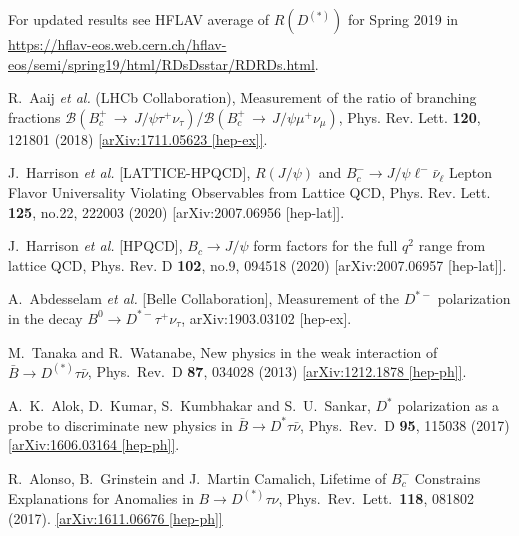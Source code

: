 \documentclass[reprint,showpacs,aps,prd,nofootinbib,superscriptaddress,longbibliography]{revtex4-1}
\begin{document}
\begin{thebibliography}{99}
For updated results see HFLAV average of $R(D^{(\ast)})$ for Spring 2019 in \url{https://hflav-eos.web.cern.ch/hflav-eos/semi/spring19/html/RDsDsstar/RDRDs.html}.


R.~Aaij {\it et al.} (LHCb Collaboration), Measurement of the ratio of branching fractions $\mathcal{B}(B_c^+\,\to\,J/\psi\tau^+\nu_\tau)$/$\mathcal{B}(B_c^+\,\to\,J/\psi\mu^+\nu_\mu)$,  Phys. Rev. Lett. \textbf{120}, 121801 (2018) \href{http://arxiv.org/abs/1711.05623}{[arXiv:1711.05623 [hep-ex]]}.

J.~Harrison \textit{et al.} [LATTICE-HPQCD], $R(J/\psi)$ and $B_c^- \rightarrow J/\psi \ell^-\bar{\nu}_\ell$ Lepton Flavor Universality Violating Observables from Lattice QCD,
Phys. Rev. Lett. \textbf{125}, no.22, 222003 (2020)
[arXiv:2007.06956 [hep-lat]].

J.~Harrison \textit{et al.} [HPQCD], $B_c \rightarrow J/\psi$ form factors for the full $q^2$ range from lattice QCD,
Phys. Rev. D \textbf{102}, no.9, 094518 (2020)
[arXiv:2007.06957 [hep-lat]].

  A.~Abdesselam {\it et al.} [Belle Collaboration],
  Measurement of the $D^{\ast-}$ polarization in the decay $B^0 \to D^{\ast -}\tau^+\nu_{\tau}$,
  arXiv:1903.03102 [hep-ex].

M.~Tanaka and R.~Watanabe, New physics in the weak interaction of $\bar B\to D^{(*)}\tau\bar\nu$, Phys.\ Rev.\ D {\bf 87}, 034028 (2013)
\href{http://arxiv.org/abs/1212.1878}{[arXiv:1212.1878 [hep-ph]]}.

A.~K.~Alok, D.~Kumar, S.~Kumbhakar and S.~U.~Sankar, $D^{*}$ polarization as a probe to discriminate new physics in $\bar{B}\to D^{*} \tau \bar{\nu}$, Phys.\ Rev.\ D {\bf 95}, 115038 (2017)
\href{http://arxiv.org/abs/1606.03164}{[arXiv:1606.03164 [hep-ph]]}.

R.~Alonso, B.~Grinstein and J.~Martin Camalich, Lifetime of $B_c^-$ Constrains Explanations for Anomalies in  $B\to D^{(*)}\tau\nu$, Phys.\ Rev.\ Lett.\  {\bf 118}, 081802 (2017). \href{http://arxiv.org/abs/1611.06676}{[arXiv:1611.06676 [hep-ph]]}   %


\end{thebibliography}
\end{document}
